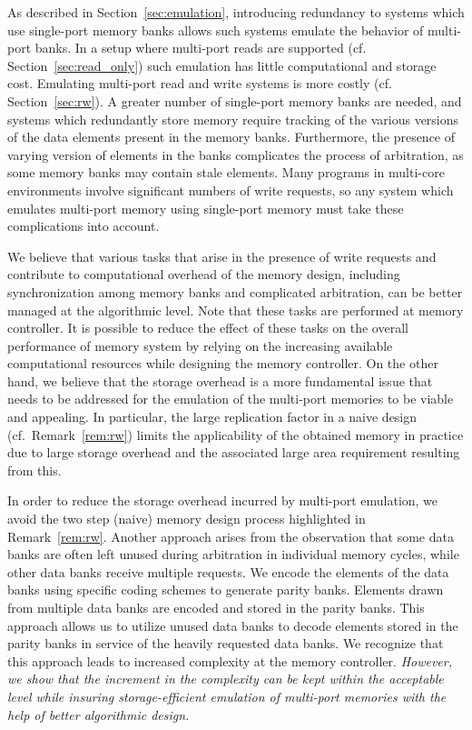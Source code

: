 As described in Section~\ref{sec:emulation}, introducing redundancy to systems which use single-port memory banks allows such systems emulate the behavior of multi-port banks. In a setup where multi-port reads are supported (cf. Section~\ref{sec:read_only}) such emulation has little computational and storage cost. Emulating multi-port read and write systems is more costly (cf. Section~\ref{sec:rw}). A greater number of single-port memory banks are needed, and systems which redundantly store memory require tracking of the various versions of the data elements present in the memory banks. Furthermore, the presence of varying version of elements in the banks complicates the process of arbitration, as some memory banks may contain stale elements. Many programs in multi-core environments involve significant numbers of write requests, so any system which emulates multi-port memory using single-port memory must take these complications into account.

{\color{red}We believe that various tasks that arise in the presence of write requests and contribute to computational overhead of the memory design, including synchronization among memory banks and complicated arbitration, can be better managed at the algorithmic level. Note that these tasks are performed at memory controller. It is possible to reduce the effect of these tasks on the overall performance of memory system by relying on the increasing available computational resources while designing the memory controller. On the other hand, we believe that the storage overhead is a more fundamental issue that needs to be addressed for the emulation of the multi-port memories to be viable and appealing. In particular, the large replication factor in a naive design (cf.~Remark~\ref{rem:rw}) limits the applicability of the obtained memory in practice due to large storage overhead and the associated large area requirement resulting from this.}

In order to reduce the storage overhead incurred by multi-port emulation, we avoid the two step (naive) memory design process highlighted in Remark~\ref{rem:rw}. Another approach arises from the observation that some data banks are often left unused during arbitration in individual memory cycles, while other data banks receive multiple requests. We encode the elements of the data banks using specific coding schemes to generate parity banks. Elements drawn from multiple data banks are encoded and stored in the parity banks. This approach allows us to utilize unused data banks to decode elements stored in the parity banks in service of the heavily requested data banks. We recognize that this approach leads to increased complexity at the memory controller. {\color{red} {\em However, we show that the increment in the complexity can be kept within the acceptable level while insuring storage-efficient emulation of multi-port memories with the help of better algorithmic design.}}

